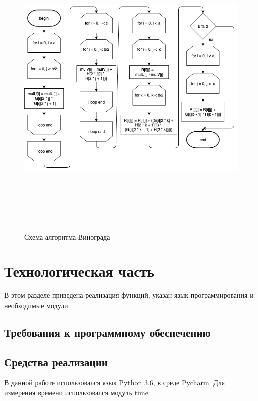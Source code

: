 \documentclass[12pt]{article}
\begin{document}
\begin{figure}[ht!]
	\centering
	\includegraphics[width=130mm, height=150mm]{wino.png}
	\caption{Схема алгоритма Винограда \label{overflow}}
\end{figure}

\newpage

\newpage
\section{Технологическая часть}

В этом разделе приведена реализация функций, указан язык программирования и необходимые модули. 
\subsection{Требования к программному обеспечению}

\subsection{Средства реализации}
В данной работе использовался язык Python 3.6, в среде Pycharm. Для измерения времени использовался модуль time.
\end{document}
